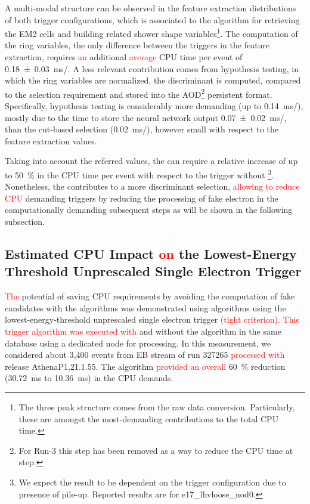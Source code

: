 A multi-modal structure can be observed in the feature extraction distributions
of both trigger configurations, which is associated to the algorithm
for retrieving the EM2 cells and building related shower shape
variables\footnote{The three peak structure comes from the raw data conversion.
	Particularly, these are amongst the most-demanding contributions to
	the \fastcalo total CPU time.}. The computation of the ring variables, the only difference between the
triggers in the \fastcalo feature extraction, requires \textcolor{red}{an} additional \textcolor{red}{average} CPU time per
event of \SI{0.18 \pm 0.03}{\ms/}. 
A less relevant contribution
comes from hypothesis testing, in which the ring variables are normalized, the
discriminant is computed, compared to the selection requirement and stored into
the AOD\footnote{For Run-3 this step has been removed as a way to reduce the CPU time at \fastcalo step.} 
persistent format. 
Specifically, \rnn{} hypothesis testing is considerably more demanding
(up to \SI{0.14}{\ms/}), mostly due to the time 
to store the neural network output \SI{0.07 \pm 0.02}{\ms/}, 
than the cut-based selection
(\SI{0.02}{\ms/}), however small with respect to the feature
extraction values. 


Taking into account the referred values, the \rnn{} can require a
relative increase of up to \SI{50}{\%} in the \fastcalo{} CPU time per event
with respect to the trigger without \rnn{}\footnote{We expect the result to be
	dependent on the trigger configuration due to presence of pile-up. Reported
	results are for e17\_lhvloose\_nod0.}. Nonetheless, the \rnn{} contributes to
a more discriminant selection, \textcolor{red}{allowing to reduce CPU} demanding triggers
by reducing the processing of fake electron in the computationally demanding
subsequent steps as will be shown in the following subsection.

\FloatBarrier
\subsection{Estimated CPU Impact \textcolor{red}{on} the Lowest-Energy Threshold Unprescaled
	Single Electron Trigger}\label{top:cpu_e26}

\textcolor{red}{The} potential of saving CPU requirements by
avoiding the computation of fake candidates with the \rnn algorithms was demonstrated using algorithms using the lowest-energy-threshold unprescaled single electron trigger
\textcolor{red}{(tight criterion). This trigger algorithm was executed with}
and without the \rnn{} algorithm in the same database using a dedicated node for processing.
In this measurement, we considered about 3,400 events from EB stream of run
327265 \textcolor{red}{processed with} release AthenaP1,21.1.55. The \rnn{} algorithm \textcolor{red}{provided an overall} 
\SI{60}{\%} reduction (\SI{30.72}{\milli\second} to \SI{10.36}{\milli\second})
in the CPU demands.


